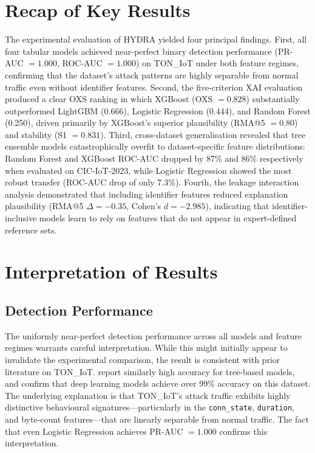 \documentclass[12pt,a4paper]{report}
\begin{document}
\section{Recap of Key Results}
\label{sec:recap}

The experimental evaluation of HYDRA yielded four principal findings. First, all four tabular models achieved near-perfect binary detection performance (PR-AUC $= 1.000$, ROC-AUC $= 1.000$) on TON\_IoT under both feature regimes, confirming that the dataset's attack patterns are highly separable from normal traffic even without identifier features. Second, the five-criterion XAI evaluation produced a clear OXS ranking in which XGBoost (OXS $= 0.828$) substantially outperformed LightGBM (0.666), Logistic Regression (0.444), and Random Forest (0.250), driven primarily by XGBoost's superior plausibility (RMA@5 $= 0.80$) and stability (S1 $= 0.831$). Third, cross-dataset generalisation revealed that tree ensemble models catastrophically overfit to dataset-specific feature distributions: Random Forest and XGBoost ROC-AUC dropped by 87\% and 86\% respectively when evaluated on CIC-IoT-2023, while Logistic Regression showed the most robust transfer (ROC-AUC drop of only 7.3\%). Fourth, the leakage interaction analysis demonstrated that including identifier features reduced explanation plausibility (RMA@5 $\Delta = -0.35$, Cohen's $d = -2.985$), indicating that identifier-inclusive models learn to rely on features that do not appear in expert-defined reference sets.

\section{Interpretation of Results}
\label{sec:interpretation}

\subsection*{Detection Performance}

The uniformly near-perfect detection performance across all models and feature regimes warrants careful interpretation. While this might initially appear to invalidate the experimental comparison, the result is consistent with prior literature on TON\_IoT. \citet{alsaedi2020} report similarly high accuracy for tree-based models, and \citet{ferrag2022} confirm that deep learning models achieve over 99\% accuracy on this dataset. The underlying explanation is that TON\_IoT's attack traffic exhibits highly distinctive behavioural signatures---particularly in the \texttt{conn\_state}, \texttt{duration}, and byte-count features---that are linearly separable from normal traffic. The fact that even Logistic Regression achieves PR-AUC $= 1.000$ confirms this interpretation.
\end{document}
